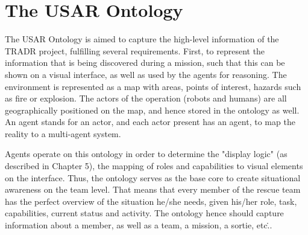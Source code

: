 \chapter{The USAR Ontology}
The USAR Ontology is aimed to capture the high-level information of the TRADR project, fulfilling several requirements. First, to represent the information that is being discovered during a mission, such that this can be shown on a visual interface, as well as used by the agents for reasoning. 
The environment is represented as a map with areas, points of interest, hazards such as fire or explosion. The actors of the operation (robots and humans) are all geographically positioned on the map, and hence stored in the ontology as well. An agent stands for an actor, and each actor present has an agent, to map the reality to a multi-agent system. 

Agents operate on this ontology in order to determine the "display logic" (as described in Chapter 5), the mapping of roles and capabilities to visual elements on the interface. Thus, the ontology serves as the base core to create situational awareness on the team level. That means that every member of the rescue team has the perfect overview of the situation he/she needs, given his/her role, task, capabilities, current status and activity. The ontology hence should capture information about a member, as well as a team, a mission, a sortie, etc\... 

